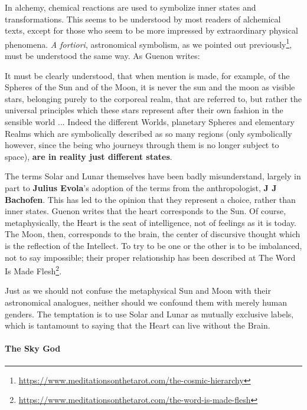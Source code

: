 In alchemy, chemical reactions are used to symbolize inner states and transformations. This seems to be understood by most readers of alchemical texts, except for those who seem to be more impressed by extraordinary physical phenomena. \emph{A fortiori}, astronomical symbolism, as we pointed out previously\footnote{\url{https://www.meditationsonthetarot.com/the-cosmic-hierarchy}}, must be understood the same way. As Guenon writes:

\begin{quotex}
It must be clearly understood, that when mention is made, for example, of the Spheres of the Sun and of the Moon, it is never the sun and the moon as visible stars, belonging purely to the corporeal realm, that are referred to, but rather the universal principles which these stars represent after their own fashion in the sensible world ... Indeed the different Worlds, planetary Spheres and elementary Realms which are symbolically described as so many regions (only symbolically however, since the being who journeys through them is no longer subject to space), \textbf{are in reality just different states}.
\end{quotex}


{}


The terms Solar and Lunar themselves have been badly misunderstand, largely in part to \textbf{Julius Evola}'s adoption of the terms from the anthropologist, \textbf{J J Bachofen}. This has led to the opinion that they represent a choice, rather than inner states. Guenon writes that the heart corresponds to the Sun. Of course, metaphysically, the Heart is the seat of intelligence, not of feelings as it is today. The Moon, then, corresponds to the brain, the center of discursive thought which is the reflection of the Intellect. To try to be one or the other is to be imbalanced, not to say impossible; their proper relationship has been described at The Word Is Made Flesh\footnote{\url{https://www.meditationsonthetarot.com/the-word-is-made-flesh}}.

Just as we should not confuse the metaphysical Sun and Moon with their astronomical analogues, neither should we confound them with merely human genders. The temptation is to use Solar and Lunar as mutually exclusive labels, which is tantamount to saying that the Heart can live without the Brain.

\paragraph{The Sky God}


